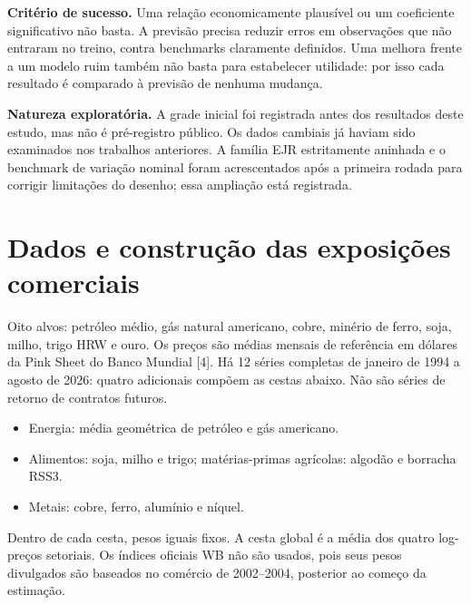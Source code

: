 \documentclass[11pt,a4paper]{article}
\begin{document}
\textbf{Critério de sucesso.} Uma relação economicamente plausível ou um coeficiente significativo não basta. A previsão precisa reduzir erros em observações que não entraram no treino, contra benchmarks claramente definidos. Uma melhora frente a um modelo ruim também não basta para estabelecer utilidade: por isso cada resultado é comparado à previsão de nenhuma mudança.

\textbf{Natureza exploratória.} A grade inicial foi registrada antes dos resultados deste estudo, mas não é pré-registro público. Os dados cambiais já haviam sido examinados nos trabalhos anteriores. A família EJR estritamente aninhada e o benchmark de variação nominal foram acrescentados após a primeira rodada para corrigir limitações do desenho; essa ampliação está registrada.

\clearpage
\section*{Dados e construção das exposições comerciais}
Oito alvos: petróleo médio, gás natural americano, cobre, minério de ferro, soja, milho, trigo HRW e ouro. Os preços são médias mensais de referência em dólares da Pink Sheet do Banco Mundial [4]. Há 12 séries completas de janeiro de 1994 a agosto de 2026: quatro adicionais compõem as cestas abaixo. Não são séries de retorno de contratos futuros.

\begin{itemize}[itemsep=4pt]
\item Energia: média geométrica de petróleo e gás americano.
\item Alimentos: soja, milho e trigo; matérias-primas agrícolas: algodão e borracha RSS3.
\item Metais: cobre, ferro, alumínio e níquel.
\end{itemize}

Dentro de cada cesta, pesos iguais fixos. A cesta global é a média dos quatro log-preços setoriais. Os índices oficiais WB não são usados, pois seus pesos divulgados são baseados no comércio de 2002--2004, posterior ao começo da estimação.
\end{document}
